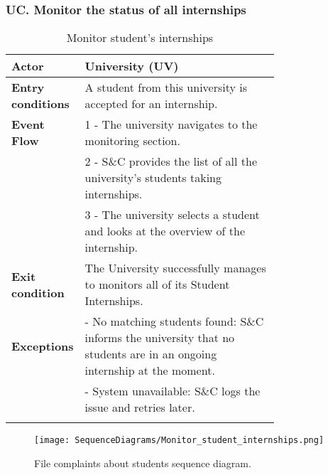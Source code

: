\subsubsection*{UC\cuc . Monitor the status of all internships}
\begin{center}
    \begin{longtable}{|l|p{0.75\linewidth}|}
        \hline
        \textbf{Actor}            & University (UV) \\
        \hline
        \textbf{Entry conditions} & A student from this university is accepted for an internship. \\
        \hline
        \textbf{Event Flow}       & 1 - The university navigates to the monitoring section. \\
        & 2 - S\&C provides the list of all the university's students taking internships. \\
        & 3 - The university selects a student and looks at the overview of the internship. \\
        \hline
        \textbf{Exit condition}   & The University successfully manages to monitors all of its Student Internships. \\       
        \hline
        \textbf{Exceptions}       & - No matching students found: S\&C informs the university that no students are in an ongoing internship at the moment. \\
        & - System unavailable: S\&C logs the issue and retries later. \\
        \hline
        \caption{Monitor student's internships}
        \label{tab:monitor_student_internships_usecase}
    \end{longtable}
\end{center}

\begin{figure}[H]
    \begin{center}
        \texttt{[image: SequenceDiagrams/Monitor\_student\_internships.png]}
        \caption{File complaints about students sequence diagram.}
        \label{fig:monitor_student_internships_seqd}%
    \end{center}
\end{figure}

